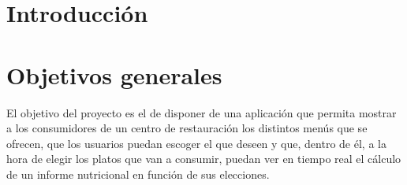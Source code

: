
\section{Introducción}


\begin{comment}
\begin{table}[p]
	\centering
	\begin{tabularx}{\linewidth}{ p{0.21\columnwidth} p{0.71\columnwidth} }
		\toprule
		\textbf{CU-1}    & \textbf{Ejemplo de caso de uso}\\
		\toprule
		\textbf{Versión}              & 1.0    \\
		\textbf{Autor}                & Alumno \\
		\textbf{Requisitos asociados} & RF-xx, RF-xx \\
		\textbf{Descripción}          & La descripción del CU \\
		\textbf{Precondición}         & Precondiciones (podría haber más de una) \\
		\textbf{Acciones}             &
		\begin{enumerate}
			\def\labelenumi{\arabic{enumi}.}
			\tightlist
			\item Pasos del CU
			\item Pasos del CU (añadir tantos como sean necesarios)
		\end{enumerate}\\
		\textbf{Postcondición}        & Postcondiciones (podría haber más de una) \\
		\textbf{Excepciones}          & Excepciones \\
		\textbf{Importancia}          & Alta o Media o Baja... \\
		\bottomrule
	\end{tabularx}
	\caption{CU-1 Nombre del caso de uso.}
\end{table}
\end{comment}

\section{Objetivos generales}

El objetivo del proyecto es el de disponer de una aplicación que permita mostrar a los consumidores de un centro de restauración los distintos menús que se ofrecen, que los usuarios puedan escoger el que deseen y que, dentro de él, a la hora de elegir los platos que van a consumir, puedan ver en tiempo real el cálculo de un informe nutricional en función de sus elecciones. 

